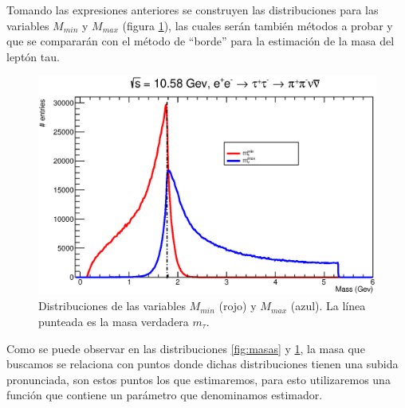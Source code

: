 Tomando las expresiones anteriores se construyen las distribuciones para las variables \(M_{min}\) y \(M_{max}\) (figura \ref{fig:MminMmaxDistri}), las cuales serán también métodos a probar y que se compararán con el método de ``borde'' para la estimación de la masa del leptón tau.
\begin{figure}[h]
    \centering
    \includegraphics[scale=.6]{Images/m_min_plot.eps}
    \caption{\small{Distribuciones de las variables \(M_{min}\) (rojo) y \(M_{max}\) (azul). La línea punteada es la masa verdadera \(m_{\tau}\).}}
    \label{fig:MminMmaxDistri}
\end{figure}

Como se puede observar en las distribuciones \ref{fig:masas} y \ref{fig:MminMmaxDistri}, la masa que buscamos se relaciona con puntos donde dichas distribuciones tienen una subida pronunciada, son estos puntos los que estimaremos, para esto utilizaremos una función que contiene un parámetro que denominamos estimador.

